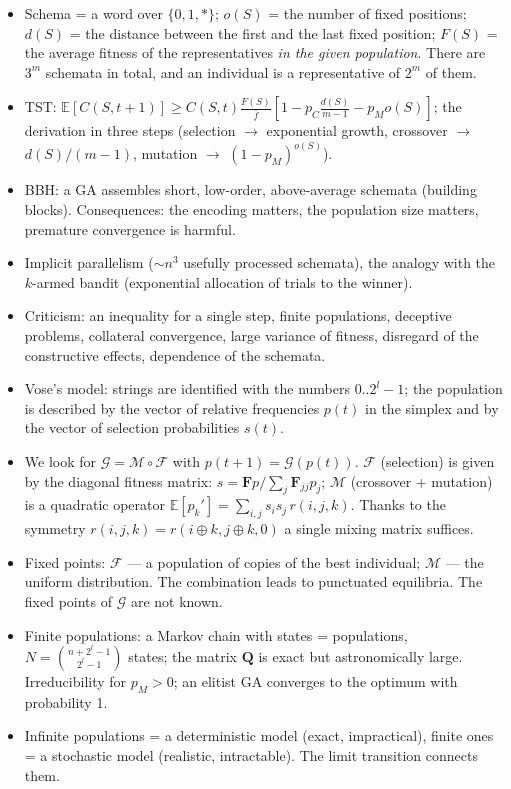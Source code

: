 \documentclass[11pt,a4paper]{article}
\theoremstyle{definition}
\begin{document}
\begin{itemize}
\item Schema = a word over $\{0,1,*\}$; $o(S)$ = the number of fixed positions;
  $d(S)$ = the distance between the first and the last fixed position;
  $F(S)$ = the average fitness of the representatives \emph{in the given
  population}. There are $3^m$ schemata in total, and an individual is a
  representative of $2^m$ of them.
\item TST: $\mathbb{E}[C(S,t+1)] \ge C(S,t)\frac{F(S)}{\bar f}
  [1 - p_C \frac{d(S)}{m-1} - p_M o(S)]$; the derivation in three steps
  (selection $\to$ exponential growth, crossover $\to$ $d(S)/(m-1)$,
  mutation $\to$ $(1-p_M)^{o(S)}$).
\item BBH: a GA assembles short, low-order, above-average schemata (building
  blocks). Consequences: the encoding matters, the population size matters,
  premature convergence is harmful.
\item Implicit parallelism ($\sim n^3$ usefully processed schemata), the analogy
  with the $k$-armed bandit (exponential allocation of trials to the winner).
\item Criticism: an inequality for a single step, finite populations, deceptive
  problems, collateral convergence, large variance of fitness, disregard of the
  constructive effects, dependence of the schemata.
\item Vose's model: strings are identified with the numbers $0..2^l-1$; the
  population is described by the vector of relative frequencies $p(t)$ in the
  simplex and by the vector of selection probabilities $s(t)$.
\item We look for $\mathcal{G} = \mathcal{M} \circ \mathcal{F}$ with
  $p(t+1)=\mathcal{G}(p(t))$. $\mathcal{F}$ (selection) is given by the diagonal
  fitness matrix: $s = \mathbf{F}p / \sum_j \mathbf{F}_{jj}p_j$;
  $\mathcal{M}$ (crossover + mutation) is a quadratic operator
  $\mathbb{E}[p_k'] = \sum_{i,j} s_i s_j\, r(i,j,k)$. Thanks to the symmetry
  $r(i,j,k) = r(i\oplus k, j \oplus k, 0)$ a single mixing matrix suffices.
\item Fixed points: $\mathcal{F}$ --- a population of copies of the best
  individual; $\mathcal{M}$ --- the uniform distribution. The combination leads
  to punctuated equilibria. The fixed points of $\mathcal{G}$ are not known.
\item Finite populations: a Markov chain with states = populations,
  $N = \binom{n+2^l-1}{2^l-1}$ states; the matrix $\mathbf{Q}$ is exact but
  astronomically large. Irreducibility for $p_M>0$; an elitist GA converges to
  the optimum with probability 1.
\item Infinite populations = a deterministic model (exact, impractical), finite
  ones = a stochastic model (realistic, intractable). The limit transition
  connects them.
\end{itemize}
\end{document}
